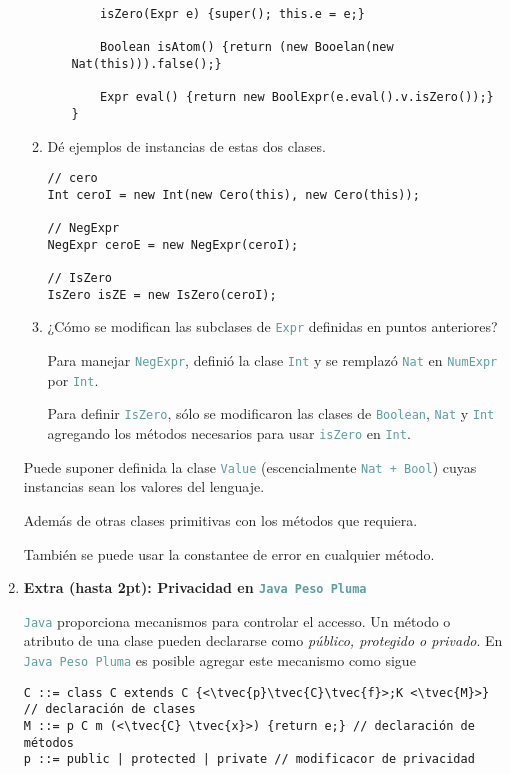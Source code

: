 \documentclass{article}
\newcommand{\tx}[1]{\textcolor{Black} {\texttt{#1}}}
\newcommand{\tp}[1]{\textcolor{CadetBlue} {\texttt{#1}}}
\newcommand{\tb}[1]{\textcolor{RoyalPurple} {\textbf{#1}}}
\newcommand{\ti}[1]{\textcolor{RoyalPurple} {\textit{#1}}}
\newcommand{\pt}[1]{\textcolor{RoyalPurple}{(#1pt)}}
\newcommand{\tvec}[1]{$\vec{\tx{#1}}$ }
\begin{document}
\begin{enumerate}
\begin{enumerate}
\begin{itemize}
\begin{verbatim}
    isZero(Expr e) {super(); this.e = e;}

    Boolean isAtom() {return (new Booelan(new Nat(this))).false();}

    Expr eval() {return new BoolExpr(e.eval().v.isZero());}
}
                \end{verbatim}
            \end{itemize}

            \item Dé ejemplos de instancias de estas dos clases.

            \begin{verbatim}
// cero
Int ceroI = new Int(new Cero(this), new Cero(this));

// NegExpr
NegExpr ceroE = new NegExpr(ceroI);

// IsZero
IsZero isZE = new IsZero(ceroI);
            \end{verbatim}

            \item ¿Cómo se modifican las subclases de \tp{Expr} definidas en
            puntos anteriores?

            Para manejar \tp{NegExpr}, definió la clase \tp{Int} y se remplazó
            \tp{Nat} en \tp{NumExpr} por \tp{Int}.

            Para definir \tp{IsZero}, sólo se modificaron las clases de
            \tp{Boolean}, \tp{Nat} y \tp{Int} agregando los métodos necesarios
            para usar \tp{isZero} en \tp{Int}.
        \end{enumerate}

        Puede suponer definida la clase \tp{Value} (escencialmente
        \tp{Nat + Bool}) cuyas instancias sean los valores del lenguaje.

        Además de otras clases primitivas con los métodos que requiera.

        También se puede usar la constantee de error en cualquier método.

        \item \tb{Extra \pt{hasta 2}: Privacidad en \tp{Java Peso Pluma}}

        \tp{Java} proporciona mecanismos para controlar el accesso. Un método o
        atributo de una clase pueden declararse como \ti{público, protegido o
        privado}. En \tp{Java Peso Pluma} es posible agregar este mecanismo como
        sigue

        \begin{verbatim}
C ::= class C extends C {<\tvec{p}\tvec{C}\tvec{f}>;K <\tvec{M}>} // declaración de clases
M ::= p C m (<\tvec{C} \tvec{x}>) {return e;} // declaración de métodos
p ::= public | protected | private // modificacor de privacidad
        \end{verbatim}


\end{enumerate}
\end{document}
